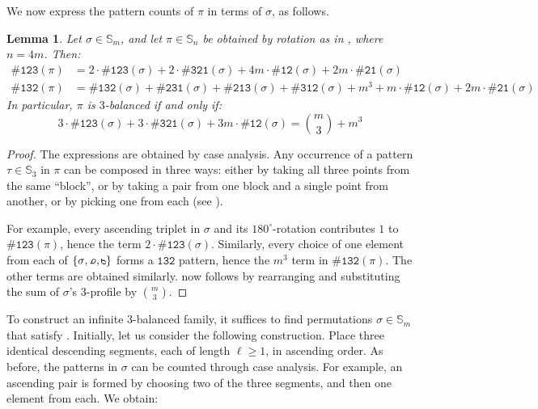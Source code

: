 \documentclass{article}
\newtheorem{lemma}[theorem]{Lemma}
\newcommand{\threeb}{$3$-balanced\xspace}
\newcommand{\pc}[2]{{\# \mathtt{ #1 } \left( #2 \right)}}
\theoremstyle{remark}
\theoremstyle{plain}
\begin{document}
We now express the pattern counts of $\pi$ in terms of $\sigma$, as follows.

\begin{lemma}
    \label{lemma:pi_rot_inv_sigma_profile}
    Let $\sigma\in\mathbb{S}_m$, and let $\pi\in\mathbb{S}_n$ be obtained by rotation as in , where $n=4m$. Then:
    \begin{align*}
        \pc{123}{\pi} & = 2\cdot\pc{123}{\sigma} + 2\cdot\pc{321}{\sigma} + 4m\cdot\pc{12}{\sigma}+2m\cdot\pc{21}{\sigma} \\
        \pc{132}{\pi} & = \pc{132}{\sigma} + \pc{231}{\sigma} + \pc{213}{\sigma} + \pc{312}{\sigma} + m^3 + m\cdot\pc{12}{\sigma} + 2m\cdot\pc{21}{\sigma}
    \end{align*}
    In particular, $\pi$ is \threeb if and only if:
    \begin{equation}
        \label{eq:sigma3bal}
        3\cdot \pc{123}{\sigma}+3\cdot\pc{321}{\sigma}+3m\cdot\pc{12}{\sigma}=\binom{m}{3}+m^3
    \end{equation}
\end{lemma}
\begin{proof}
    The expressions are obtained by case analysis. Any occurrence of a pattern $\tau \in \mathbb{S}_3$ in $\pi$ can be composed in three ways: either by taking all three points from the same ``block'', or by taking a pair from one block and a single point from another, or by picking one from each (see ). 
    
    For example, every ascending triplet in $\sigma$ and its $180^\circ$-rotation  contributes $1$ to $\pc{123}{\pi}$, hence the term $2\cdot \pc{123}{\sigma}$. Similarly, every choice of one element from each of $\{\rotatebox[origin=c]{0}{\ensuremath{\sigma}}, \rotatebox[origin=c]{180}{\ensuremath{\sigma}}, \rotatebox[origin=c]{90}{\ensuremath{\sigma}}\}$ forms a $\mathtt{132}$ pattern, hence the $m^3$ term in $\pc{132}{\pi}$. The other terms are obtained similarly.  now follows by rearranging and substituting the sum of $\sigma$'s $3$-profile by $\binom{m}{3}$.
\end{proof}
To construct an infinite \threeb family, it suffices to find permutations $\sigma\in\mathbb{S}_m$ that satisfy . Initially, let us consider the following construction. Place three identical descending segments, each of length $\ell\geq 1$, in ascending order. As before, the patterns in $\sigma$ can be counted through case analysis. For example, an ascending pair is formed by choosing two of the three segments, and then one element from each. We obtain:
\end{document}
